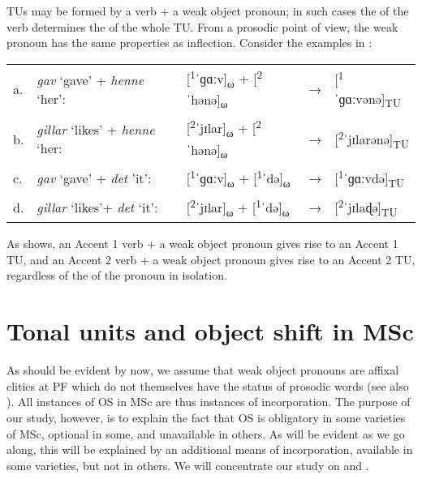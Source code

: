 \documentclass[output=paper]{LSP/langsci}
\begin{document}
TUs may be formed by a verb + a weak object pronoun; in such cases the  of the verb determines the  of the whole TU. From a prosodic point of view, the weak pronoun has the same properties as inflection. Consider the  examples in :

\ea%
    \label{ex:erteschik:5}
\begin{tabular}[t]{lllll}
a. & \textit{gav} ‘gave’ + \textit{henne} ‘her’:\textsuperscript{} & [\textsuperscript{1}ˈɡɑːv]\textsubscript{ω} + [\textsuperscript{2}ˈhənə]\textsubscript{ω}  & → & [\textsuperscript{1}ˈɡɑːvənə]\textsubscript{TU} \\
b. & \textit{gillar} ‘likes’ + \textit{henne} ‘her:                & [\textsuperscript{2}ˈjɪlar]\textsubscript{ω} + [\textsuperscript{2}ˈhənə]\textsubscript{ω} & → & [\textsuperscript{2}ˈjɪlarənə]\textsubscript{TU}\\
c. & \textit{gav} ‘gave’ + \textit{det} ’it’:                      & [\textsuperscript{1}ˈɡɑːv]\textsubscript{ω} + [\textsuperscript{1}ˈdə]\textsubscript{ω}    & → & [\textsuperscript{1}ˈɡɑːvdə]\textsubscript{TU}  \\
d. & \textit{gillar} ‘likes’+ \textit{det} ‘it’:                   & [\textsuperscript{2}ˈjɪlar]\textsubscript{ω} + [\textsuperscript{1}ˈdə]\textsubscript{ω}   & → & [\textsuperscript{2}ˈjɪlaɖə]\textsubscript{TU}  \\
\end{tabular}
\z

As  shows, an Accent 1 verb + a weak object pronoun gives rise to an Accent 1 TU, and an Accent 2 verb + a weak object pronoun gives rise to an Accent 2 TU, regardless of the  of the pronoun in isolation.

\section{Tonal units and object shift in MSc}\label{sec:erteschik:4}

As should be evident by now, we assume that weak object pronouns are affixal clitics at PF which do not themselves have the status of prosodic words (see also \citealt{Selkirk1996}). All instances of OS in MSc are thus instances of incorporation. The purpose of our study, however, is to explain the fact that OS is obligatory in some varieties of MSc, optional in some, and unavailable in others. As will be evident as we go along, this will be explained by an additional means of incorporation, available in some varieties, but not in others. We will concentrate our study on  and .
\end{document}

